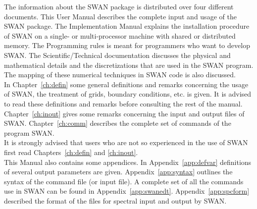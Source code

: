\documentclass[12pt]{book}
\begin{document}
\tableofcontents

 \label{ch:intro}

The information about the SWAN package is distributed over four different documents. This User Manual describes
the complete input and usage of the SWAN package. The Implementation Manual explains the installation procedure
of SWAN on a single- or multi-processor machine with shared or distributed memory. The Programming rules is meant
for programmers who want to develop SWAN. The Scientific/Technical documentation discusses the physical and
mathematical details and the discretizations that are used in the SWAN program. The mapping of these numerical
techniques in SWAN code is also discussed.
\nocite{Impman,Progrul,Techdoc}
\\[2ex]
\noindent
In Chapter~\ref{ch:defin} some general definitions and remarks concerning the usage of SWAN, the treatment of grids,
boundary conditions, etc. is given. It is advised to read these definitions and remarks before consulting the rest
of the manual. Chapter~\ref{ch:inout} gives some remarks concerning the input and output files of SWAN.
Chapter~\ref{ch:comm} describes the complete set of commands of the program SWAN.
\\[2ex]
\noindent
It is strongly advised that users who are not so experienced in the use of SWAN first read Chapters~\ref{ch:defin}
and \ref{ch:inout}.
\\[2ex]
\noindent
This Manual also contains some appendices. In Appendix~\ref{app:defvar} definitions of several output parameters are given.
Appendix~\ref{app:syntax} outlines the syntax of the command file (or input file). A complete set of all the commands use
in SWAN can be found in Appendix~\ref{app:swanedt}. Appendix~\ref{app:spcform} described the format of the files for
spectral input and output by SWAN.

 \label{ch:defin}
\end{document}
